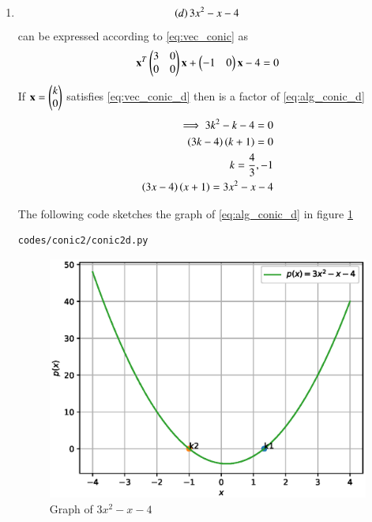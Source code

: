 \begin{enumerate}[label=\thesection.\arabic*.,ref=\thesection.\theenumi]
\item 
\begin{align}
\label{eq:alg_conic_d}
\left(d\right) 3x^{2} -x -4
\end{align}
can be expressed according to \ref{eq:vec_conic} as 
\begin{align}
\label{eq:vec_conic_d}
\mathbf{x}^T \begin{pmatrix}3 & 0\\0 & 0\end{pmatrix}\mathbf{x}+ \begin{pmatrix}-1 & 0\end{pmatrix}\mathbf{x} -4 =0
\end{align}
If $\mathbf{x}=\begin{pmatrix}k\\0\end{pmatrix}$ satisfies \ref{eq:vec_conic_d} then  is a factor of \ref{eq:alg_conic_d}
\begin{align}
\implies 
3k^{2}-k-4=0
\\
\left(3k-4\right)\left(k+1\right)=0
\\
k=\frac{4}{3},-1
\\
\left(3x-4\right)\left(x+1\right)= 3x^{2} -x -4
\end{align}

The following code sketches the graph of \ref{eq:alg_conic_d} in figure \ref{fig:conic2d}
\begin{lstlisting}
codes/conic2/conic2d.py
\end{lstlisting}
\begin{figure}[!ht]
\centering
\includegraphics[width=\columnwidth]{./codes/conic2/pyfigs/conic2d.eps}
\caption{Graph of $3x^{2} -x -4$}
\label{fig:conic2d}
\end{figure}


\end{enumerate}
